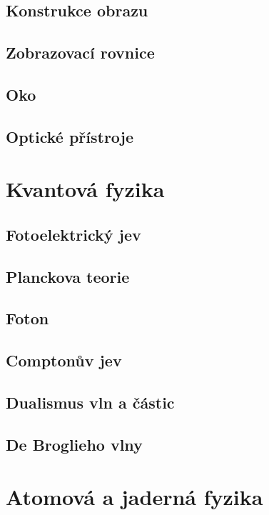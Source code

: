 \documentclass[titlepage]{book}
\begin{document}
\section{Konstrukce obrazu}

\section{Zobrazovací rovnice}

\section{Oko}

\section{Optické přístroje}

\chapter{Kvantová fyzika}

\section{Fotoelektrický jev}

\section{Planckova teorie}

\section{Foton}

\section{Comptonův jev}

\section{Dualismus vln a částic}

\section{De Broglieho vlny}

\chapter{Atomová a jaderná fyzika}
\end{document}
